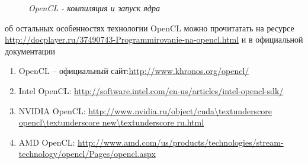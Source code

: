 {\begin{figure}[H]
		\caption{\textit{OpenCL - компиляция и запуск ядра}}
		\label{OpenCLKernelExample:image}
	\end{figure}
	 об остальных особенностях технологии OpenCL можно прочитатать на ресурсе \url{http://docplayer.ru/37490743-Programmirovanie-na-opencl.html} и в официальной документации
	\begin{enumerate}
		\sloppy
		\item OpenCL – официальный сайт:\url{http://www.khronos.org/opencl/}
		\item Intel OpenCL: \url{http://software.intel.com/en-us/articles/intel-opencl-sdk/}
		\item NVIDIA OpenCL: \url{http://www.nvidia.ru/object/cuda\textunderscore opencl\textunderscore new\textunderscore ru.html}
		\item AMD OpenCL: \url{http://www.amd.com/us/products/technologies/stream-technology/opencl/Pages/opencl.aspx}
	\end{enumerate}
}